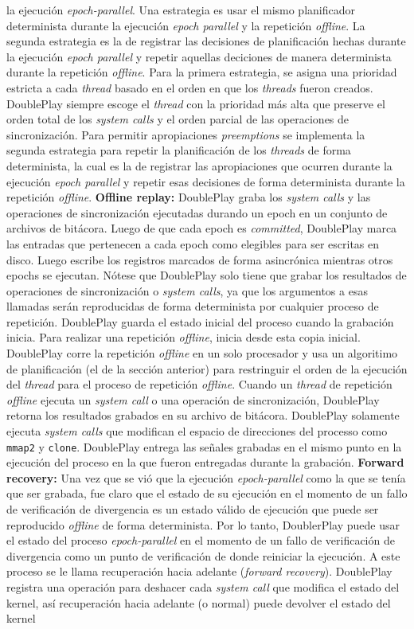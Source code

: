 la ejecución \emph{epoch-parallel}. Una estrategia es usar el mismo planificador determinista durante la ejecución \emph{epoch parallel} y la repetición \emph{offline}. La segunda estrategia es la de registrar las decisiones de planificación hechas durante la ejecución \emph{epoch parallel} y repetir aquellas deciciones de manera determinista durante la repetición \emph{offline}. Para la primera estrategia, se asigna una prioridad estricta a cada \emph{thread} basado en el orden en que los \emph{threads} fueron creados. DoublePlay siempre escoge el \emph{thread} con la prioridad más alta que preserve el orden total de los \emph{system calls} y el orden parcial de las operaciones de sincronización. Para permitir apropiaciones \emph{preemptions} se implementa la segunda estrategia para repetir la planificación de los \emph{threads} de forma determinista, la cual es la de registrar las apropiaciones que ocurren durante la ejecución \emph{epoch parallel} y repetir esas decisiones de forma determinista durante la repetición \emph{offline}. \textbf{Offline replay:} DoublePlay graba los \emph{system calls} y las operaciones de sincronización ejecutadas durando un epoch en un conjunto de archivos de bitácora. Luego de que cada epoch es \emph{committed}, DoublePlay marca las entradas que pertenecen a cada epoch como elegibles para ser escritas en disco. Luego escribe los registros marcados de forma asincrónica mientras otros epochs se ejecutan. Nótese que DoublePlay solo tiene que grabar los resultados de operaciones de sincronización o \emph{system calls}, ya que los argumentos a esas llamadas serán reproducidas de forma determinista por cualquier proceso de repetición. DoublePlay guarda el estado inicial del proceso cuando la grabación inicia. Para realizar una repetición \emph{offline}, inicia desde esta copia inicial. DoublePlay corre la repetición \emph{offline} en un solo procesador y usa un algoritimo de planificación (el de la sección anterior) para restringuir el orden de la ejecución del \emph{thread} para el proceso de repetición \emph{offline}. Cuando un \emph{thread} de repetición \emph{offline} ejecuta un \emph{system call} o una operación de sincronización, DoublePlay retorna los resultados grabados en su archivo de bitácora. DoublePlay solamente ejecuta \emph{system calls} que modifican el espacio de direcciones del processo como \texttt{mmap2} y \texttt{clone}. DoublePlay entrega las señales grabadas en el mismo punto en la ejecución del proceso en la que fueron entregadas durante la grabación. \textbf{Forward recovery:} Una vez que se vió que la ejecución \emph{epoch-parallel} como la que se tenía que ser grabada, fue claro que el estado de su ejecución en el momento de un fallo de verificación de divergencia es un estado válido de ejecución que puede ser reproducido \emph{offline} de forma determinista. Por lo tanto, DoublerPlay puede usar el estado del proceso \emph{epoch-parallel} en el momento de un fallo de verificación de divergencia como un punto de verificación de donde reiniciar la ejecución. A este proceso se le llama recuperación hacia adelante (\emph{forward recovery}). DoublePlay registra una operación para deshacer cada \emph{system call} que modifica el estado del kernel, así recuperación hacia adelante (o normal) puede devolver el estado del kernel 